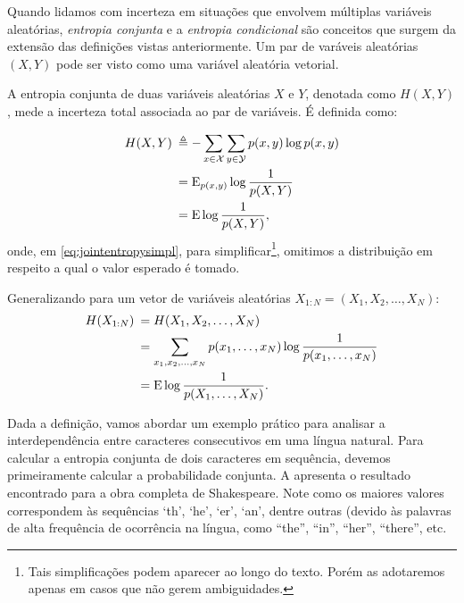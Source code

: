 Quando lidamos com incerteza em situações que envolvem múltiplas variáveis aleatórias,
\emph{entropia conjunta} e a \emph{entropia condicional}
são conceitos que surgem da extensão das definições
vistas anteriormente. Um par de varáveis aleatórias $(X,Y)$ pode ser visto como
uma variável aleatória vetorial.

A entropia conjunta de duas variáveis aleatórias $X$ e $Y$, denotada como $H(X,Y)$, 
mede a incerteza total associada ao par de variáveis. É definida como:
\begin{definition}
\begin{subequations}\label{eq:jointentropy}
\begin{align}    
H(X,Y) \: &\triangleq - \sum_{x \in \mathcal{X}} \sum_{y \in \mathcal{Y}} p(x,y) \log p(x,y) \\
	  &= \E_{p(x,y)} \log \frac{1}{p(X,Y)} \\
	  &= \E \log \frac{1}{p(X,Y)},\label{eq:jointentropysimpl}
\end{align}
\end{subequations}
onde, em \ref{eq:jointentropysimpl}, para simplificar\footnote{Tais simplificações podem
aparecer ao longo do texto. Porém as adotaremos apenas em casos que não gerem ambiguidades.}, 
omitimos a distribuição em respeito
a qual o valor esperado é tomado.
\end{definition}

Generalizando para um vetor de variáveis aleatórias $X_{1:N} = (X_1, X_2, \ldots, X_N)$:
\begin{subequations}\label{eq:entropiavetor}
\begin{align}
H(X_{1:N}) \: &= H(X_1, X_2, \ldots, X_N) \\
     &= \sum_{x_1, x_2, \ldots , x_N} p(x_1, \ldots, x_N) \log \frac{1}{p(x_1, \ldots, x_N)} \\
     &= \mathrm{E} \log \frac{1}{p(X_1, \ldots, X_N)} .
\end{align}
\end{subequations}

Dada a definição, vamos abordar um exemplo prático para analisar a
interdependência entre caracteres consecutivos em uma língua natural. Para
calcular a entropia conjunta de dois caracteres em sequência, devemos
primeiramente calcular a probabilidade conjunta. A
 apresenta o resultado encontrado para a
obra completa de Shakespeare. Note como os maiores valores correspondem às
sequências `th', `he', `er', `an', dentre outras (devido às palavras de alta
frequência de ocorrência na língua, como ``the'', ``in'', ``her'', ``there'',
etc.

